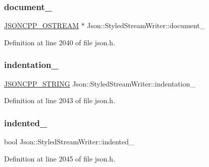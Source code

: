 \subsubsection{\texorpdfstring{document\+\_\+}{document\_}}
{\footnotesize\ttfamily \hyperlink{config_8h_a37a25be5fca174927780caeb280094ce}{J\+S\+O\+N\+C\+P\+P\+\_\+\+O\+S\+T\+R\+E\+AM} $\ast$ Json\+::\+Styled\+Stream\+Writer\+::document\+\_\+\hspace{0.3cm}{\ttfamily [private]}}



Definition at line 2040 of file json.\+h.

\hypertarget{class_json_1_1_styled_stream_writer_aa45d8fb4ca82d0550be9042012303713}{}\label{class_json_1_1_styled_stream_writer_aa45d8fb4ca82d0550be9042012303713} 
\subsubsection{\texorpdfstring{indentation\+\_\+}{indentation\_}}
{\footnotesize\ttfamily \hyperlink{config_8h_a1e723f95759de062585bc4a8fd3fa4be}{J\+S\+O\+N\+C\+P\+P\+\_\+\+S\+T\+R\+I\+NG} Json\+::\+Styled\+Stream\+Writer\+::indentation\+\_\+\hspace{0.3cm}{\ttfamily [private]}}



Definition at line 2043 of file json.\+h.

\hypertarget{class_json_1_1_styled_stream_writer_aa12db1753619a9b48da41f3e45e3275d}{}\label{class_json_1_1_styled_stream_writer_aa12db1753619a9b48da41f3e45e3275d} 
\subsubsection{\texorpdfstring{indented\+\_\+}{indented\_}}
{\footnotesize\ttfamily bool Json\+::\+Styled\+Stream\+Writer\+::indented\+\_\+\hspace{0.3cm}{\ttfamily [private]}}



Definition at line 2045 of file json.\+h.

